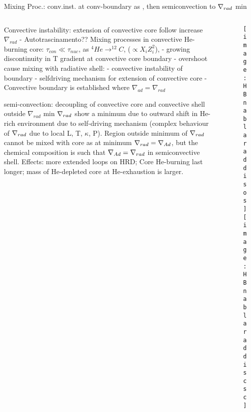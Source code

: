 \begin{frame}{Mixing Proc.: conv.inst. at conv-boundary as ,\xaumenta{\nrad} then semiconvection to $\nabla_{rad}{}$ min}
\begin{columns}[T]
\begin{column}{0.55\textwidth}
    \begin{block}{Convective instability: extension of convective core follow increase $\nabla_{rad}$ - Autotrascinamento??}
Mixing processes in convective He-burning core: $\tau_{con}\ll\tau_{nuc}$, as $^4He\to^{12}C$,  ($\propto X_iZ_i^2$), \xaumenta{\nrad{}} - growing discontinuity in T gradient at convective core boundary - overshoot cause mixing with radiative shell: \xaumenta{\kappa} - convective instability of boundary - selfdriving mechanism for extension of convective core - Convective boundary is established where $\nabla_{ad}=\nabla_{rad}$
\end{block}
\begin{block}{semi-convection: decoupling of convective core and convective shell outside $\nabla_{rad}$ min}
    $\nabla_{rad}{}$ show a minimum due to outward shift in He-rich environment due to self-driving mechanism (complex behaviour of $\nabla_{rad}$ due to local L, T, $\kappa$, P).
    Region outside minimum of $\nabla_{rad}{}$ cannot be mixed with core as at minimum $\nabla_{rad}{}=\nabla_{Ad}{}$, but the chemical composition is such that $\nabla_{Ad}{}=\nabla_{rad}{}$ in semiconvective shell.
    Effects: more extended loops on HRD; Core He-burning last longer; mass of He-depleted core at He-exhaustion is larger.
\end{block}
\end{column}
\begin{column}{0.45\textwidth}
\begin{figure}[!ht]  
\texttt{[image: HBnablaraddisos]}\label{fig:HBnablaraddisos}
\texttt{[image: HBnablaraddiscsc]}\label{fig:HBnablaraddiscsc}
\end{figure}
\end{column}
\end{columns}
\end{frame}

